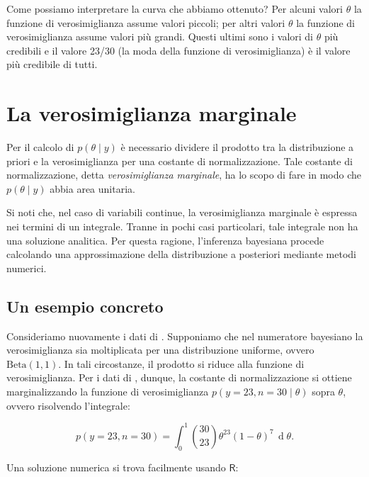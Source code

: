 \documentclass[
  11pt,
]{krantz}
\newcommand{\R}{\textsf{R}} %
\theoremstyle{definition}
\theoremstyle{definition}
\theoremstyle{definition}
\theoremstyle{definition}
\theoremstyle{remark}
\begin{document}
Come possiamo interpretare la curva che abbiamo ottenuto? Per alcuni valori \(\theta\) la funzione di verosimiglianza assume valori piccoli; per altri valori \(\theta\) la funzione di verosimiglianza assume valori più grandi. Questi ultimi sono i valori di \(\theta\) più credibili e il valore 23/30 (la moda della funzione di verosimiglianza) è il valore più credibile di tutti.

\hypertarget{sec:const-normaliz-bino23}{%
\section{La verosimiglianza marginale}\label{sec:const-normaliz-bino23}}

Per il calcolo di \(p(\theta \mid y)\) è necessario dividere il prodotto tra la distribuzione a priori e la verosimiglianza per una costante di normalizzazione. Tale costante di normalizzazione, detta \emph{verosimiglianza marginale}, ha lo scopo di fare in modo che \(p(\theta \mid y)\) abbia area unitaria.

Si noti che, nel caso di variabili continue, la verosimiglianza marginale è espressa nei termini di un integrale. Tranne in pochi casi particolari, tale integrale non ha una soluzione analitica. Per questa ragione, l'inferenza bayesiana procede calcolando una approssimazione della distribuzione a posteriori mediante metodi numerici.

\hypertarget{un-esempio-concreto-2}{%
\subsection{Un esempio concreto}\label{un-esempio-concreto-2}}

Consideriamo nuovamente i dati di \citet{zetschefuture2019}. Supponiamo che nel numeratore bayesiano la verosimiglianza sia moltiplicata per una distribuzione uniforme, ovvero \(\mbox{Beta}(1, 1)\). In tali circostanze, il prodotto si riduce alla funzione di verosimiglianza. Per i dati di \citet{zetschefuture2019}, dunque, la costante di normalizzazione si ottiene marginalizzando la funzione di verosimiglianza \(p(y = 23, n = 30 \mid \theta)\) sopra \(\theta\), ovvero risolvendo l'integrale:

\begin{equation}
p(y = 23, n = 30) = \int_0^1 \binom{30}{23} \theta^{23} (1-\theta)^{7} \,\operatorname {d}\!\theta.
\label{eq:intlikebino23}
\end{equation}

Una soluzione numerica si trova facilmente usando \(\R\):
\end{document}
